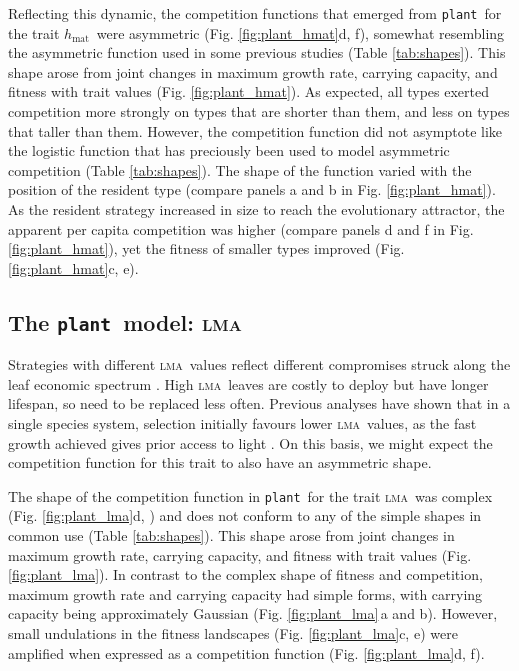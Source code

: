 \documentclass[a4paper,11pt]{article}
\newcommand{\plant}{{\tt plant}}
\newcommand{\hmat}{\ensuremath{h_{\text{mat}}}}
\newcommand{\lma}{\textsc{lma}}
\begin{document}
Reflecting this dynamic, the competition functions that emerged from \plant\ for the trait \hmat\ were asymmetric (Fig. \ref{fig:plant_hmat}d, f), somewhat resembling the asymmetric function used in some previous studies \citep{Law-1997, Kisdi-1999, Geritz-1999, Egas-2004, Calcagno-2006, DAndrea-2013} (Table \ref{tab:shapes}). This shape arose from joint changes in maximum growth rate, carrying capacity, and fitness with trait values (Fig. \ref{fig:plant_hmat}). As expected, all types exerted competition more strongly on types that are shorter than them, and less on types that taller than them. However, the competition function did not asymptote like the logistic function that has preciously been used to model asymmetric competition (Table \ref{tab:shapes}). The shape of the function varied with the position of the resident type (compare panels a and b in Fig. \ref{fig:plant_hmat}). As the resident strategy increased in size to reach the evolutionary attractor, the apparent per capita competition was higher (compare panels d and f in Fig. \ref{fig:plant_hmat}), yet the fitness of smaller types improved (Fig. \ref{fig:plant_hmat}c, e).

\subsection{The \plant\ model: \lma}

Strategies with different \lma\ values reflect different compromises struck along the leaf economic spectrum \citep{Reich-1997,Wright-2004}. High \lma\ leaves are costly to deploy but have longer lifespan, so need to be replaced less often. Previous analyses have shown that in a single species system, selection initially favours lower \lma\ values, as the fast growth achieved gives prior access to light \citep{Falster-2017}. On this basis, we might expect the competition function for this trait to also have an asymmetric shape.

The shape of the competition function in \plant\ for the trait \lma\ was complex (Fig. \ref{fig:plant_lma}d, ) and does not conform to any of the simple shapes in common use (Table \ref{tab:shapes}). This shape arose from joint changes in maximum growth rate, carrying capacity, and fitness with trait values (Fig. \ref{fig:plant_lma}). In contrast to the complex shape of fitness and competition, maximum growth rate and carrying capacity had simple forms, with carrying capacity being approximately Gaussian (Fig. \ref{fig:plant_lma}\,a and b). However, small undulations in the fitness landscapes (Fig. \ref{fig:plant_lma}c, e) were amplified when expressed as a competition function (Fig. \ref{fig:plant_lma}d, f). 
\end{document}
